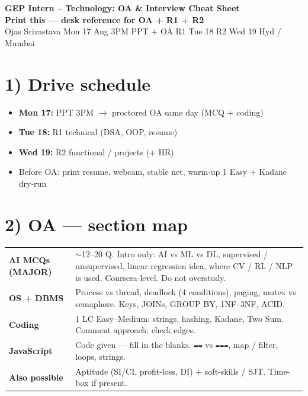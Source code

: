 \documentclass[a4paper,9pt]{extarticle}
\begin{document}
\begin{center}
  {\LARGE\textbf{GEP Intern -- Technology: OA \& Interview Cheat Sheet}}\\[0.5pt]
  {\small\color{hot}\textbf{Print this --- desk reference for OA + R1 + R2}}\\[1pt]
  {\small Ojas Srivastava \textbar{} Mon 17 Aug 3PM PPT + OA \textbar{} R1 Tue 18 \textbar{} R2 Wed 19 \textbar{} Hyd / Mumbai}
\end{center}

\section{1) Drive schedule}
\begin{itemize}
  \item \textbf{Mon 17:} PPT 3PM $\to$ proctored OA same day (MCQ + coding)
  \item \textbf{Tue 18:} R1 technical (DSA, OOP, resume)
  \item \textbf{Wed 19:} R2 functional / projects (+ HR)
  \item Before OA: print resume, webcam, stable net, warm-up 1 Easy + Kadane dry-run
\end{itemize}

\section{2) OA --- section map}
\noindent\begin{tabularx}{\textwidth}{@{}>{\bfseries}p{3.4cm} X@{}}
AI MCQs (MAJOR) & $\sim$12--20 Q. Intro only: AI vs ML vs DL, supervised / unsupervised, linear regression idea, where CV / RL / NLP is used. Coursera-level. Do not overstudy. \\
OS + DBMS & Process vs thread, deadlock (4 conditions), paging, mutex vs semaphore. Keys, JOINs, GROUP BY, 1NF--3NF, ACID. \\
Coding & 1 LC Easy--Medium: strings, hashing, Kadane, Two Sum. Comment approach; check edges. \\
JavaScript & Code given --- fill in the blanks. \texttt{==} vs \texttt{===}, map / filter, loops, strings. \\
Also possible & Aptitude (SI/CI, profit-loss, DI) + soft-skills / SJT. Time-box if present. \\
\end{tabularx}
\end{document}
